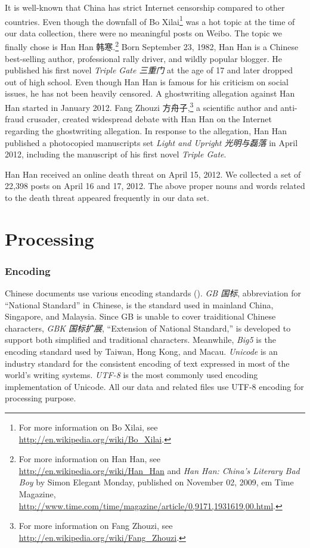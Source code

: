 \documentclass[11pt]{article}
\newcommand{\1}[1]{{\mathbf 1}\left\{#1\right\}}        %
\begin{document}
It is well-known that China has strict Internet censorship compared to other countries. Even though the downfall of Bo Xilai\footnote{For more information on Bo Xilai, see \url{http://en.wikipedia.org/wiki/Bo_Xilai}.}
was a hot topic at the time of our data collection, there were no meaningful posts on Weibo. 
The topic we finally chose is Han Han 韩寒.\footnote{For more information on Han Han, see \url{http://en.wikipedia.org/wiki/Han_Han} and {\em Han Han: China's Literary Bad Boy} by Simon Elegant Monday, published on November 02, 2009, {em Time Magazine}, \url{http://www.time.com/time/magazine/article/0,9171,1931619,00.html}.}
Born September 23, 1982, Han Han
is a Chinese best-selling author, professional rally driver, and  wildly  popular blogger. He published his first novel {\em Triple Gate 三重门} at the age of 17 and later dropped out of high school. Even though Han Han is famous for his criticism on social issues, he has not been heavily censored. A ghostwriting allegation against Han Han started in January 2012. Fang Zhouzi 方舟子,\footnote{For more information on Fang Zhouzi, see \url{http://en.wikipedia.org/wiki/Fang_Zhouzi}.}
 a scientific author and anti-fraud crusader, created widespread debate with Han Han on the Internet regarding the ghostwriting allegation. In response to the allegation, Han Han published a photocopied manuscripts set {\em Light and Upright 光明与磊落} in April 2012, including the manuscript of his first novel {\em Triple Gate}. 
 
Han Han received an online death threat on April 15, 2012. We collected a set of 22,398 posts on April 16 and 17, 2012. The above proper nouns and words related to the death threat appeared frequently in our data set. 




\section{Processing}


\subsubsection{Encoding}
Chinese documents use various encoding standards (\cite{wong2009introduction}). {\em GB 国标}, abbreviation for ``National Standard'' in Chinese, is the standard used in mainland China, Singapore, and Malaysia. Since GB is unable to cover traiditional Chinese characters, {\em GBK 国标扩展}, ``Extension of National Standard,'' is developed to support both simplified and traditional characters. Meanwhile, {\em Big5} is the encoding standard used by Taiwan, Hong Kong, and Macau. {\em Unicode} is an industry standard for the consistent encoding of text expressed in most of the world's writing systems. {\em UTF-8} is the most commonly used encoding implementation of Unicode. All our data and related files use UTF-8 encoding for processing purpose.
\end{document}
